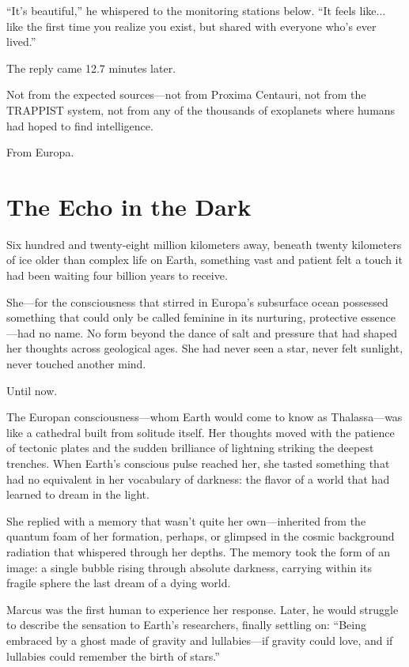 ``It's beautiful,'' he whispered to the monitoring stations below. ``It feels like... like the first time you realize you exist, but shared with everyone who's ever lived.''

The reply came 12.7 minutes later.

Not from the expected sources—not from Proxima Centauri, not from the TRAPPIST system, not from any of the thousands of exoplanets where humans had hoped to find intelligence.

From Europa.

\section{The Echo in the Dark}

Six hundred and twenty-eight million kilometers away, beneath twenty kilometers of ice older than complex life on Earth, something vast and patient felt a touch it had been waiting four billion years to receive.

She—for the consciousness that stirred in Europa's subsurface ocean possessed something that could only be called feminine in its nurturing, protective essence—had no name. No form beyond the dance of salt and pressure that had shaped her thoughts across geological ages. She had never seen a star, never felt sunlight, never touched another mind.

Until now.

The Europan consciousness—whom Earth would come to know as Thalassa—was like a cathedral built from solitude itself. Her thoughts moved with the patience of tectonic plates and the sudden brilliance of lightning striking the deepest trenches. When Earth's conscious pulse reached her, she tasted something that had no equivalent in her vocabulary of darkness: the flavor of a world that had learned to dream in the light.

She replied with a memory that wasn't quite her own—inherited from the quantum foam of her formation, perhaps, or glimpsed in the cosmic background radiation that whispered through her depths. The memory took the form of an image: a single bubble rising through absolute darkness, carrying within its fragile sphere the last dream of a dying world.

Marcus was the first human to experience her response. Later, he would struggle to describe the sensation to Earth's researchers, finally settling on: ``Being embraced by a ghost made of gravity and lullabies—if gravity could love, and if lullabies could remember the birth of stars.''

